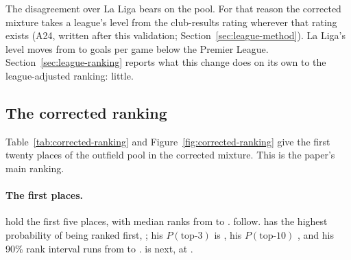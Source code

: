 \documentclass[11pt,a4paper]{article}
\begin{document}
The disagreement over La Liga bears on the pool. For that reason the
corrected mixture takes a league's level from the club-results rating wherever
that rating exists (A24, written after this validation;
Section~\ref{sec:league-method}). La Liga's level moves from
\ValGapSpainRapm{} to \ValGapSpainClub{} goals per game below the Premier
League. Section~\ref{sec:league-ranking} reports what this change does on its
own to the league-adjusted ranking: little.

\subsection{The corrected ranking}
\label{sec:corrected-ranking}

Table~\ref{tab:corrected-ranking} and Figure~\ref{fig:corrected-ranking} give
the first twenty places of the outfield pool in the corrected mixture. This is
the paper's main ranking.

\paragraph{The first places.}
\CorrectedTopFive{} hold the first five places, with median ranks from
\CorrectedTopFiveMedianLo{} to \CorrectedTopFiveMedianHi{}.
\CorrectedNextFive{} follow. \CorrectedTopName{} has the highest probability
of being ranked first, \CorrectedTopPFirst{}; his $P(\text{top-3})$ is
\CorrectedTopPTopThree{}, his $P(\text{top-10})$ \CorrectedTopPTopTen{}, and
his 90\% rank interval runs from \CorrectedTopRankLo{} to
\CorrectedTopRankHi{}. \CorrectedSecondName{} is next, at
\CorrectedSecondPFirst{}.
\end{document}
